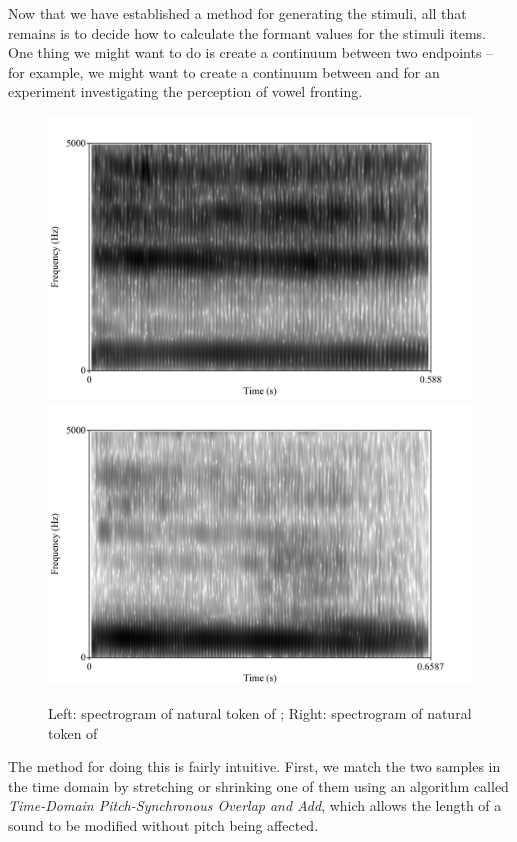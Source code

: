 \documentclass{article}\usepackage[]{graphicx}\usepackage[]{color}
\begin{document}
Now that we have established a method for generating the stimuli, all that remains is to decide how to calculate the formant values for the stimuli items. One thing we might want to do is create a continuum between two endpoints -- for example, we might want to create a continuum between \textipa{[i]} and \textipa{[u]} for an experiment investigating the perception of vowel fronting.

\begin{figure}[!ht]
\centering
\includegraphics[scale=0.3,keepaspectratio]{i.png}
\includegraphics[scale=0.3,keepaspectratio]{u.png}
\caption{Left: spectrogram of natural token of \textipa{[i]}; Right: spectrogram of natural token of \textipa{[u]}}
\end{figure}
The method for doing this is fairly intuitive. First, we match the two samples in the time domain by stretching or shrinking one of them using an algorithm called \textit{Time-Domain Pitch-Synchronous Overlap and Add}, which allows the length of a sound to be modified without pitch being affected.
\end{document}
